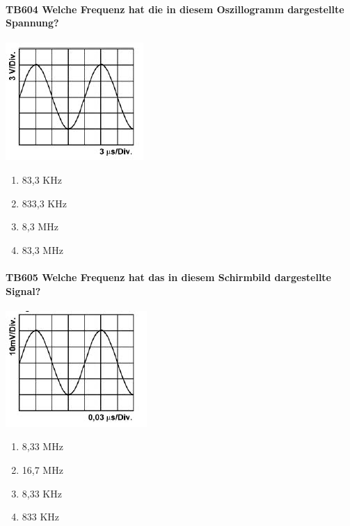 \documentclass[8pt]{article}
\begin{document}
\begin{enumerate}
\paragraph*{TB604 Welche Frequenz hat die in diesem Oszillogramm dargestellte Spannung?}
\begin{center}
	\begin{minipage}{\linewidth}
		\centering
		\includegraphics[scale=0.9]{pics/tb604_a.jpg}
	\end{minipage}
\end{center}
\begin{enumerate}[nolistsep,label=\Alph*]
\item 83,3 KHz
\item 833,3 KHz
\item 8,3 MHz
\item 83,3 MHz
\end{enumerate}



\paragraph*{TB605 Welche Frequenz hat das in diesem Schirmbild dargestellte Signal?}
\begin{center}
	\begin{minipage}{\linewidth}
		\centering
		\includegraphics[scale=0.9]{pics/tb605_a.jpg}
	\end{minipage}
\end{center}
\begin{enumerate}[nolistsep,label=\Alph*]
\item 8,33 MHz
\item 16,7 MHz
\item 8,33 KHz
\item 833 KHz
\end{enumerate}




\end{enumerate}
\end{document}
